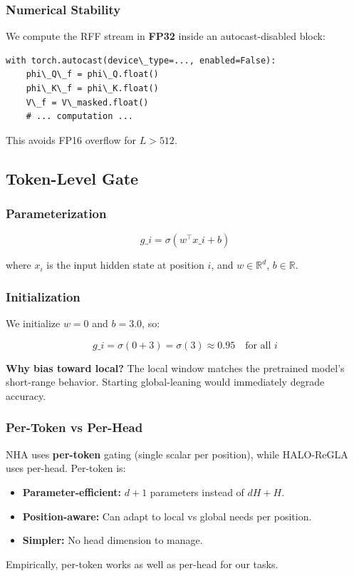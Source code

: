 \subsubsection{Numerical Stability}

We compute the RFF stream in \textbf{FP32} inside an autocast-disabled block:

\begin{lstlisting}
with torch.autocast(device\_type=..., enabled=False):
    phi\_Q\_f = phi\_Q.float()
    phi\_K\_f = phi\_K.float()
    V\_f = V\_masked.float()
    # ... computation ...
\end{lstlisting}

This avoids FP16 overflow for $L > 512$.

\subsection{Token-Level Gate}

\subsubsection{Parameterization}

\[
g\_i = \sigma(w^\top x\_i + b)
\tag{4.11}
\]

where $x_i$ is the input hidden state at position $i$, and $w \in \mathbb{R}^d$, 
$b \in \mathbb{R}$.

\subsubsection{Initialization}

We initialize $w = 0$ and $b = 3.0$, so:

\[
g\_i = \sigma(0 + 3) = \sigma(3) \approx 0.95 \quad \text{for all } i
\tag{4.12}
\]

\textbf{Why bias toward local?} The local window matches the pretrained model's 
short-range behavior. Starting global-leaning would immediately degrade 
accuracy.

\subsubsection{Per-Token vs Per-Head}

NHA uses \textbf{per-token} gating (single scalar per position), while HALO-ReGLA 
uses per-head. Per-token is:

\begin{itemize}
\item \textbf{Parameter-efficient:} $d + 1$ parameters instead of $d H + H$.
\item \textbf{Position-aware:} Can adapt to local vs global needs per position.
\item \textbf{Simpler:} No head dimension to manage.

\end{itemize}
Empirically, per-token works as well as per-head for our tasks.

